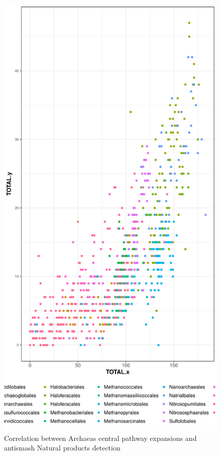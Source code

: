 \documentclass[12pt,twoside]{reedthesis}
\begin{document}
  \begin{figure}[h!tbp]
  \centering
  \includegraphics[angle = 0,scale = 0.5]{chapter2/Archaeas/ArchaeasSMASHvsExpansionsbyOrder.pdf}
  \caption[Correlation between Archaeas central pathway expansions and antismash Natural products detection]{\normalsize{Correlation between Archaeas central pathway expansions and antismash Natural products detection}}
  \label{fig:ArchaeasSMASHvsExpansionsbyOrder}
  \end{figure}
  
\end{document}

